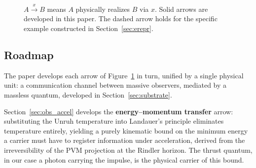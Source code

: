 \documentclass[12pt,a4paper]{article}
\begin{document}
\begin{figure}[h]
  \centering
  \caption{$A \xrightarrow{x} B$ means $A$ physically realizes 
$B$ via $x$. Solid arrows are developed in this paper. 
The dashed arrow holds for the specific example 
constructed in Section~\ref{sec:erepr}.}
\label{fig:diagram}
\end{figure}


\subsection{Roadmap}

The paper develops each arrow of Figure~\ref{fig:diagram} 
in turn, unified by a single physical unit: a communication 
channel between massive observers, mediated by a massless 
quantum, developed in Section~\ref{sec:substrate}.

Section~\ref{sec:obs_accel} develops the 
\textbf{energy--momentum transfer} arrow: substituting 
the Unruh temperature into Landauer's principle eliminates 
temperature entirely, yielding a purely kinematic bound 
on the minimum energy a carrier must have to register information 
under acceleration, derived from the irreversibility of the 
PVM projection at the Rindler horizon.
The thrust quantum, in our case a photon 
carrying the impulse, is the physical carrier of this bound.
\end{document}
